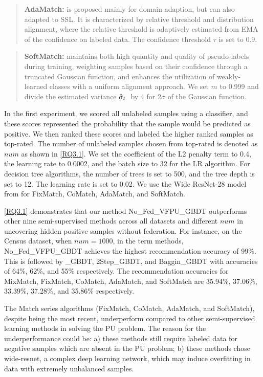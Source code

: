 \documentclass[10pt,journal,compsoc]{IEEEtran}
\begin{document}
\begin{quote}
	\textbf{AdaMatch:} is proposed mainly for domain adaption, but can also adapted to SSL. It is characterized by relative threshold and distribution alignment, where the relative threshold is adaptively estimated from EMA \cite{tarvainen2017mean} of the confidence on labeled data. The confidence threshold $\tau$ is set to 0.9.
\end{quote}

\begin{quote}
	\textbf{SoftMatch:} maintains both high quantity and quality of pseudo-labels during training, weighting samples based on their confidence through a truncated Gaussian function, and enhances the utilization of weakly-learned classes with a uniform alignment approach. We set $m$ to 0.999 and divide the estimated variance ${{\hat \sigma }_t}{\kern 1pt} {\kern 1pt} {\kern 1pt}$ by 4 for $2\sigma$ of the Gaussian function.
\end{quote}

 In the first experiment, we scored all unlabeled samples using a classifier, and these scores represented the probability that the sample would be predicted as positive. We then ranked these scores and labeled the higher ranked samples as top-rated. The number of unlabeled samples chosen from top-rated is denoted as $num$ as shown in \autoref{RQ3.1}. We set the coefficient of the L2 penalty term to 0.4, the learning rate to 0.0002, and the batch size to 32 for the LR algorithm. For decision tree algorithms, the number of trees is set to 500, and the tree depth is set to 12. The learning rate is set to 0.02. We use the Wide ResNet-28 model from \cite{oliver2018realistic} for FixMatch, CoMatch, AdaMatch, and SoftMatch.

\autoref{RQ3.1} demonstrates that our method No\_Fed\_VFPU\_GBDT outperforms other nine semi-supervised methods across all datasets and different $num$ in uncovering hidden positive samples without federation. For instance, on the Census dataset, when $num=1000$, in the term methods, No\_Fed\_VFPU\_GBDT achieves the highest recommendation accuracy of 99\%. This is followed by \_GBDT, 2Step\_GBDT, and Baggin\_GBDT with accuracies of 64\%, 62\%, and 55\% respectively. The recommendation accuracies for MixMatch, FixMatch, CoMatch, AdaMatch, and SoftMatch are 35.94\%, 37.06\%, 33.39\%, 37.28\%, and 35.86\% respectively.

The Match series algorithms (FixMatch, CoMatch, AdaMatch, and SoftMatch), despite being the most recent, underperform compared to other semi-supervised learning methods in solving the PU problem. The reason for the underperformance could be: a) these methods still require labeled data for negative samples which are absent in the PU problem; b) these methods chose wide-resnet, a complex deep learning network, which may induce overfitting in data with extremely unbalanced samples.
\end{document}
